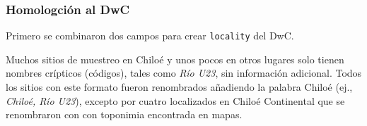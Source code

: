 \documentclass[sn-apa,pdflatex]{sn-jnl}
\newenvironment{Shaded}{\begin{snugshade}}{\end{snugshade}}
\newcommand{\AttributeTok}[1]{\textcolor[rgb]{0.13,0.29,0.53}{#1}}
\newcommand{\ControlFlowTok}[1]{\textcolor[rgb]{0.13,0.29,0.53}{\textbf{#1}}}
\newcommand{\DecValTok}[1]{\textcolor[rgb]{0.00,0.00,0.81}{#1}}
\newcommand{\FunctionTok}[1]{\textcolor[rgb]{0.13,0.29,0.53}{\textbf{#1}}}
\newcommand{\NormalTok}[1]{#1}
\newcommand{\OtherTok}[1]{\textcolor[rgb]{0.56,0.35,0.01}{#1}}
\newcommand{\SpecialCharTok}[1]{\textcolor[rgb]{0.81,0.36,0.00}{\textbf{#1}}}
\newcommand{\StringTok}[1]{\textcolor[rgb]{0.31,0.60,0.02}{#1}}
\begin{document}
\subsubsection{Homologción al DwC}\label{homologciuxf3n-al-dwc}

Primero se combinaron dos campos para crear \texttt{locality} del DwC.

\begin{Shaded}
\end{Shaded}

Muchos sitios de muestreo en Chiloé y unos pocos en otros lugares solo
tienen nombres crípticos (códigos), tales como \emph{Río U23}, sin
información adicional. Todos los sitios con este formato fueron
renombrados añadiendo la palabra Chiloé (ej., \emph{Chiloé, Río U23}),
excepto por cuatro localizados en Chiloé Continental que se renombraron
con con toponimia encontrada en mapas.
\end{document}
